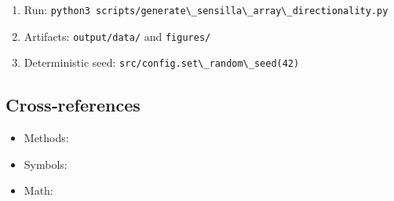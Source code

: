 \documentclass[
  13pt,
  a4paperpaper,
  12pt]{article}
\newcommand{\passthrough}[1]{#1}
\providecommand{\tightlist}{%
  \setlength{\itemsep}{0pt}\setlength{\parskip}{0pt}}
\begin{document}
\begin{enumerate}
\def\labelenumi{\arabic{enumi}.}
\tightlist
\item
  Run:
  \passthrough{\lstinline!python3 scripts/generate\_sensilla\_array\_directionality.py!}
\item
  Artifacts: \passthrough{\lstinline!output/data/!} and
  \passthrough{\lstinline!figures/!}
\item
  Deterministic seed:
  \passthrough{\lstinline!src/config.set\_random\_seed(42)!}
\end{enumerate}

\subsection{Cross‑references}\label{crossreferences}

\begin{itemize}
\tightlist
\item
  Methods: 
\item
  Symbols: 
\item
  Math: 
\end{itemize}
\end{document}
